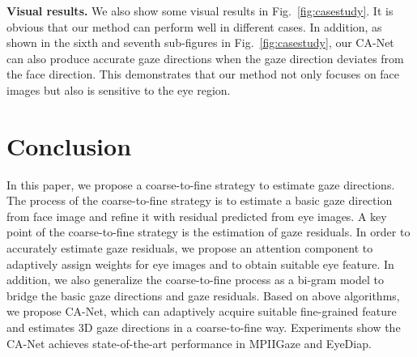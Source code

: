 \documentclass[letterpaper]{article}
\newcommand{\fref}[1]{Fig.~\ref{#1}}
\begin{document}
\textbf{Visual results.}
We also show some visual results in \fref{fig:casestudy}.
It is obvious that our method can perform well in different cases.
In addition, as shown in the sixth and seventh sub-figures in \fref{fig:casestudy}, our CA-Net can also produce accurate gaze directions when the gaze direction deviates from the face direction.
This demonstrates that our method not only focuses on face images but also is sensitive to the eye region.


\section{Conclusion}
In this paper, we propose a coarse-to-fine strategy to estimate gaze directions.
The process of the coarse-to-fine strategy is to estimate a basic gaze direction from face image and refine it with residual predicted from eye images.
A key point of the coarse-to-fine strategy is the estimation of gaze residuals.
In order to accurately estimate gaze residuals, we propose an attention component to adaptively assign weights for eye images and to obtain suitable eye feature.
In addition, we also generalize the coarse-to-fine process as a bi-gram model to bridge the basic gaze directions and gaze residuals.
Based on above algorithms, we propose CA-Net, which can adaptively acquire suitable fine-grained feature and estimates 3D gaze directions in a coarse-to-fine way.
Experiments show the CA-Net achieves state-of-the-art performance in MPIIGaze and EyeDiap.

\end{document}
